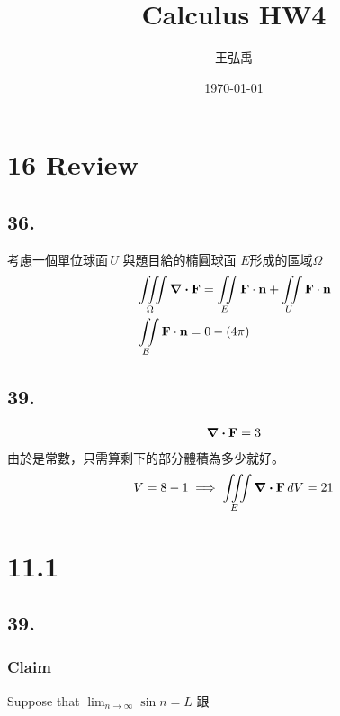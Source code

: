 \documentclass[12pt, a4paper]{article}
\title{\textbf{Calculus HW4}}
\author{王弘禹}
\date\today
\begin{document}
\begin{CJK*}{UTF8}{bsmi}
\linespread{1.5}
\maketitle
\newcommand{\st}[1]{\section*{#1}}
\newcommand{\sst}[1]{\subsection*{#1}}
\newcommand{\ssst}[1]{\subsubsection*{#1}}
\newcommand{\dsp}{\displaystyle}
\newcommand{\dx}{\,dx}
\newcommand{\dphi}{\,d\phi}
\newcommand{\dtheta}{\,d\theta}
\newcommand{\dy}{\,dy}
\newcommand{\dz}{\,dz}
\newcommand{\dr}{\,dr}
\newcommand{\drho}{\,d\rho}
\newcommand{\tb}{\textbf}
\st{16 Review}
\sst{36.}
考慮一個單位球面$\,U$ 與題目給的橢圓球面 $E$形成的區域$\Omega$
\begin{align}
    &\iiint\limits_\Omega \div{\tb F} = \iint\limits_E \tb F\cdot \tb n +\iint\limits_U \tb F\cdot\tb n \\
    &\iint\limits_E \tb F\cdot \tb n = 0-(4\pi)
\end{align}

\sst{39.}
\begin{align}
    \div{\tb F} = 3
\end{align}
由於是常數，只需算剩下的部分體積為多少就好。
\begin{align}
    V = 8-1 \implies \iiint\limits_E \div{\tb F}\,dV = 21
\end{align}
\st{11.1}
\sst{39.}
\ssst{Claim}
Suppose that $\dsp\lim_{n\to \infty}\sin n =L$
跟
\end{CJK*}
\end{document}
